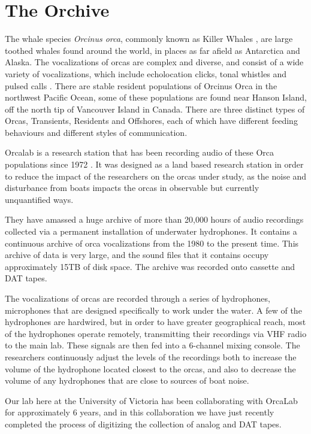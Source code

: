 \documentclass[12pt,oneside]{book}
\begin{document}
\section{The Orchive}\label{sec:the_orchive}

The whale species \emph{Orcinus orca}, commonly known as Killer Whales
\cite{ford00_book_killer_whales}, are large toothed whales found
around the world, in places as far afield as Antarctica and
Alaska\cite{estes09_orca_alaska_decline}.  The vocalizations of orcas
are complex and diverse, and consist of a wide variety of
vocalizations, which include echolocation clicks, tonal whistles and
pulsed calls \cite{deecke00}. There are stable resident populations of
Orcinus Orca in the northwest Pacific Ocean, some of these populations
are found near Hanson Island, off the north tip of Vancouver Island in
Canada.  There are three distinct types of Orcas, Transients,
Residents and Offshores, each of which have different feeding
behaviours and different styles of communication.

Orcalab is a research station that has been recording audio of these
Orca populations since 1972 \cite{weiss06}.  
 It was designed as a land based
research station in order to reduce the impact of the researchers on
the orcas under study, as the noise and disturbance from boats impacts
the orcas in observable but currently unquantified ways.

They have amassed a huge
archive of more than 20,000 hours of audio recordings collected via a
permanent installation of underwater hydrophones.  It contains a
continuous archive of orca vocalizations from the 1980 to the present
time.  This archive of data is very large, and the sound files that it
contains occupy approximately 15TB of disk space.  The archive was
recorded onto cassette and DAT tapes.  

The vocalizations of orcas are recorded through a series of
hydrophones, microphones that are designed specifically to work under
the water.  A few of the hydrophones are hardwired, but in order to
have greater geographical reach, most of the hydrophones operate
remotely, transmitting their recordings via VHF radio to the main lab.
These signals are then fed into a 6-channel mixing console.  The
researchers continuously adjust the levels of the recordings both to
increase the volume of the hydrophone located closest to the orcas,
and also to decrease the volume of any hydrophones that are close to
sources of boat noise.

Our lab here at the University of Victoria has been collaborating with
OrcaLab for approximately 6 years, and in this collaboration we have
just recently completed the process of digitizing the collection of
analog and DAT tapes.
\end{document}

